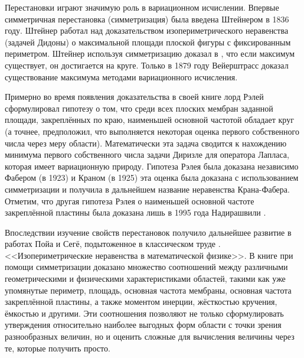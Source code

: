{\actuality}
Перестановки играют значимую роль в вариационном исчислении.
Впервые симметричная перестановка (симметризация) была введена Штейнером в 1836 году.
Штейнер работал над доказательством изопериметрического неравенства (задачей Дидоны)
о максимальной площади плоской фигуры с фиксированным периметром.
Штейнер используя симметризацию доказал в \cite{Steiner}, что если максимум существует, он достигается на круге.
Только в 1879 году Вейерштрасс доказал существование максимума методами вариационного исчисления.

Примерно во время появления доказательства в своей книге \cite{Rayleigh} лорд Рэлей сформулировал гипотезу
о том, что среди всех плоских мембран заданной площади, закреплённых по краю, наименьшей основной частотой обладает круг
(а точнее, предположил, что выполняется некоторая оценка первого собственного числа через меру области).
Математически эта задача сводится к нахождению минимума первого собственного числа задачи Диризле для оператора Лапласа,
которая имеет вариационную природу.
Гипотеза Рэлея была доказана независимо Фабером (в 1923) и Краном (в 1925) эта оценка была доказана
с использованием симметризации и получила в дальнейшем название неравенства Крана-Фабера.
Отметим, что другая гипотеза Рэлея о наименьшей основной частоте закреплённой пластины
была доказана лишь в 1995 года Надирашвили \cite{Nadirashvili}.

Впоследствии изучение свойств перестановок получило дальнейшее развитие в работах Пойа и Сегё, подытоженное в классическом труде \cite{PS_book}.
<<Изопериметрические неравенства в математической физике>>.
В книге при помощи симметризации доказано множество соотношений между различными геометрическими и физическими характеристиками областей,
такими как уже упомянутые периметр, площадь, основная частота мембраны, основная частота закреплённой пластины,
а также моментом инерции, жёсткостью кручения, ёмкостью и другими.
Эти соотношения позволяют не только сформулировать утверждения относительно наиболее выгодных форм области
с точки зрения разнообразных величин,
но и оценить сложные для вычисления величины через те, которые получить просто.

